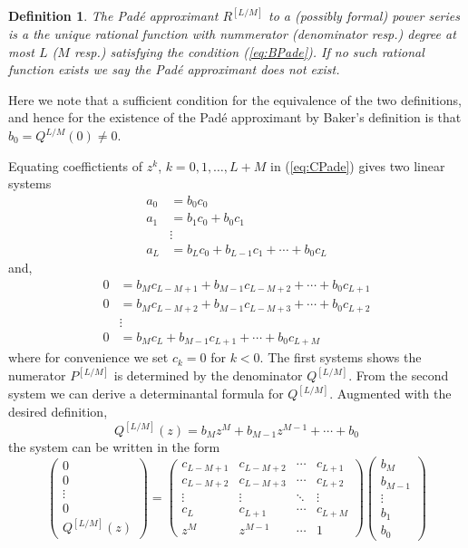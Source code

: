 \documentclass{amsart}
\newtheorem{definition}[theorem]{Definition}
\theoremstyle{remark}
\numberwithin{equation}{section}
\begin{document}
\begin{definition}
    The Pad\'e approximant $R^{[L/M]}$ to a (possibly formal) power series is a the unique rational function with nummerator (denominator resp.) degree at most $L$ ($M$ resp.) satisfying the condition (\ref{eq:BPade}). If no such rational function exists we say the Pad\'e approximant does not exist.
\end{definition}

Here we note that a sufficient condition for the equivalence of the two definitions, and hence for the existence of the Pad\'e approximant by Baker's definition is that $b_0 = Q^{L/M}(0) \neq 0$. 

Equating coeffictients of $z^k$, $k = 0, 1, \ldots, L+M$ in (\ref{eq:CPade}) gives two linear systems
\begin{align*}
    a_0 &= b_0c_0 \\
    a_1 &= b_1c_0 + b_0c_1 \\
    &\vdots \\
    a_L &= b_Lc_0 + b_{L-1}c_1 + \cdots + b_0c_L
\end{align*}
and,
\begin{align*}
    0 &= b_{M}c_{L-M+1} + b_{M-1}c_{L-M+2} + \cdots + b_0c_{L+1} \\
    0 &= b_{M}c_{L-M+2} + b_{M-1}c_{L-M+3} + \cdots + b_0c_{L+2} \\
    &\vdots \\
    0 &= b_{M}c_L + b_{M-1}c_{L+1} + \cdots + b_0c_{L+M}
\end{align*}
where for convenience we set $c_k = 0$ for $k < 0$. The first systems shows the numerator $P^{[L/M]}$ is determined by the denominator $Q^{[L/M]}$. From the second system we can derive a determinantal formula for $Q^{[L/M]}$. Augmented with the desired definition, 
\[
    Q^{[L/M]}(z) = b_Mz^M + b_{M-1}z^{M-1} + \cdots + b_0
\]
the system can be written in the form
\[
    \begin{pmatrix}
        0 \\ 0 \\ \vdots \\ 0 \\ Q^{[L/M]}(z)
    \end{pmatrix}
    =
    \begin{pmatrix}
        c_{L-M+1} & c_{L-M+2} & \cdots & c_{L+1} \\
        c_{L-M+2} & c_{L-M+3} & \cdots & c_{L+2} \\
        \vdots & \vdots & \ddots & \vdots \\
        c_{L} & c_{L+1} & \cdots & c_{L+M} \\
        z^M & z^{M-1} & \cdots & 1
    \end{pmatrix}
    \begin{pmatrix}
        b_M \\ b_{M-1} \\ \vdots \\ b_1 \\ b_0
    \end{pmatrix}
\]
\end{document}
